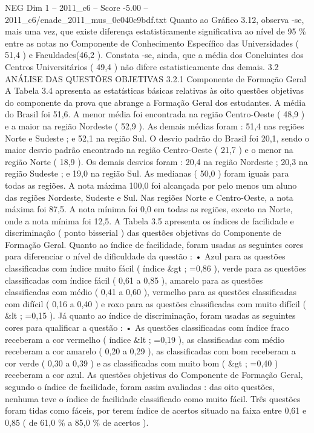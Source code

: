 \begin{textsample}{NEG Dim 1 – 2011\_c6 – Score -5.00 – 2011\_c6/enade\_2011\_mus\_0c040c9bdf.txt}
Quanto ao Gráfico 3.12, observa -se, mais uma vez, que existe diferença estatisticamente significativa ao nível de 95 \% entre as notas no Componente de Conhecimento Específico das Universidades ( 51,4 ) e Faculdades(46,2 ).
Constata -se, ainda, que a média dos Concluintes dos Centros Universitários ( 49,4 ) não difere estatisticamente das demais. 3.2 ANÁLISE DAS QUESTÕES OBJETIVAS 3.2.1 Componente de Formação Geral A Tabela 3.4 apresenta as estatísticas básicas relativas às oito questões objetivas do componente da prova que abrange a Formação Geral dos estudantes.
A média do Brasil foi 51,6.
A menor média foi encontrada na região Centro-Oeste ( 48,9 ) e a maior na região Nordeste ( 52,9 ).
As demais médias foram : 51,4 nas regiões Norte e Sudeste ; e 52,1 na região Sul.
O desvio padrão do Brasil foi 20,1, sendo o maior desvio padrão encontrado na região Centro-Oeste ( 21,7 ) e o menor na região Norte ( 18,9 ).
Os demais desvios foram : 20,4 na região Nordeste ; 20,3 na região Sudeste ; e 19,0 na região Sul.
As medianas ( 50,0 ) foram iguais para todas as regiões.
A nota máxima 100,0 foi alcançada por pelo menos um aluno das regiões Nordeste, Sudeste e Sul.
Nas regiões Norte e Centro-Oeste, a nota máxima foi 87,5.
A nota mínima foi 0,0 em todas as regiões, exceto na Norte, onde a nota mínima foi 12,5.
A Tabela 3.5 apresenta os índices de facilidade e discriminação ( ponto bisserial ) das questões objetivas do Componente de Formação Geral.
Quanto ao índice de facilidade, foram usadas as seguintes cores para diferenciar o nível de dificuldade da questão : • Azul para as questões classificadas com índice muito fácil ( índice \&gt ; =0,86 ), verde para as questões classificadas com índice fácil ( 0,61 a 0,85 ), amarelo para as questões classificadas com médio ( 0,41 a 0,60 ), vermelho para as questões classificadas com difícil ( 0,16 a 0,40 ) e roxo para as questões classificadas com muito difícil ( \&lt ; =0,15 ).
Já quanto ao índice de discriminação, foram usadas as seguintes cores para qualificar a questão : • As questões classificadas com índice fraco receberam a cor vermelho ( índice \&lt ; =0,19 ), as classificadas com médio receberam a cor amarelo ( 0,20 a 0,29 ), as classificadas com bom receberam a cor verde ( 0,30 a 0,39 ) e as classificadas com muito bom ( \&gt ; =0,40 ) receberam a cor azul.
As questões objetivas do Componente de Formação Geral, segundo o índice de facilidade, foram assim avaliadas : das oito questões, nenhuma teve o índice de facilidade classificado como muito fácil.
Três questões foram tidas como fáceis, por terem índice de acertos situado na faixa entre 0,61 e 0,85 ( de 61,0 \% a 85,0 \% de acertos ).

\end{textsample}
